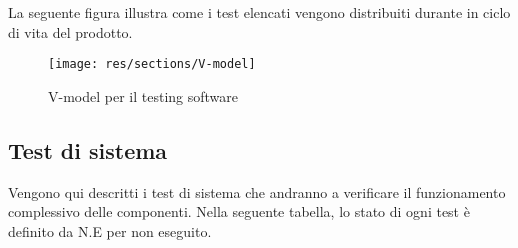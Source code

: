 	La seguente figura illustra come i test elencati vengono distribuiti durante in ciclo di vita del prodotto.

	\begin{figure}[H]
		\centering
		\texttt{[image: res/sections/V-model]}
		\caption{V-model per il testing software}
	\end{figure}
	

\subsection{Test di sistema}
	Vengono qui descritti i test di sistema che andranno a verificare il funzionamento complessivo delle componenti. Nella seguente tabella, lo stato di ogni test è definito da N.E per non eseguito.

	
	
	
	
	
